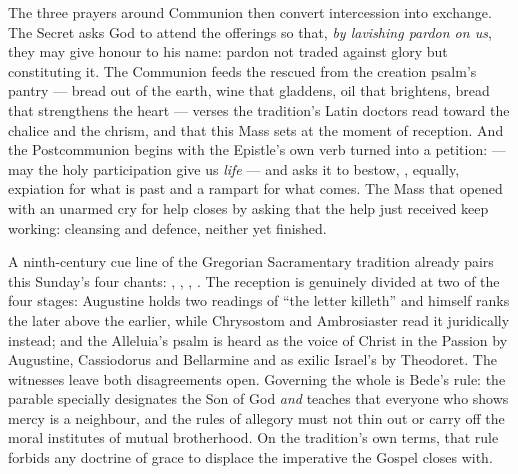 The three prayers around Communion then convert intercession into exchange.
The Secret asks God to attend the offerings so that, \textit{by lavishing
pardon on us}, they may give honour to his name: pardon not traded against
glory but constituting it. The Communion feeds the rescued from the creation
psalm's pantry --- bread out of the earth, wine that gladdens, oil that
brightens, bread that strengthens the heart --- verses the tradition's Latin
doctors read toward the chalice and the chrism, and that this Mass sets at
the moment of reception. And the Postcommunion begins with the Epistle's own
verb turned into a petition:  --- may the holy
participation give us \textit{life} --- and asks it to bestow, , equally, expiation for what is past and a rampart for what comes.
The Mass that opened with an unarmed cry for help closes by asking that the
help just received keep working: cleansing and defence, neither yet
finished.

A ninth-century cue line of the Gregorian Sacramentary tradition already
pairs this Sunday's four chants: , , , . The
reception is genuinely divided at two of the four stages: Augustine holds two
readings of ``the letter killeth'' and himself ranks the later above the
earlier, while Chrysostom and Ambrosiaster read it juridically instead; and the
Alleluia's psalm is heard as the voice of Christ in the Passion by Augustine,
Cassiodorus and Bellarmine and as exilic Israel's by Theodoret. The witnesses
leave both disagreements open. Governing the whole is Bede's rule: the parable
specially designates the Son of God \textit{and} teaches that everyone who
shows mercy is a neighbour, and the rules of allegory must not thin out or
carry off the moral institutes of mutual brotherhood. On the tradition's own
terms, that rule forbids any doctrine of grace to displace the imperative the
Gospel closes with.

\label{triptych:brief-synthesis:end}
\clearpage
